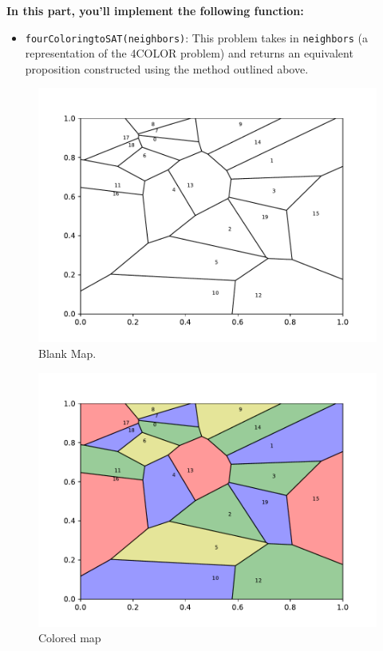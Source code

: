 \documentclass{article}
\begin{document}
    \textbf{In this part, you'll implement the following function:}
    \begin{itemize}
        \item \lstinline{fourColoringtoSAT(neighbors)}: This problem takes in \lstinline{neighbors} (a representation of the 4COLOR problem) and returns an equivalent proposition constructed using the method outlined above.
    \end{itemize}

    \begin{figure}[htbp]
        \centering
        \hspace{1cm}
        \includegraphics[scale = .6]{sp23/hw-supplements/hw3-supp-draft/blank_map.pdf}
        \caption{Blank Map.}
        \label{fig:blank_map}
    \end{figure}


    \begin{figure}[htbp]
        \centering
        \hspace{1cm}
        \includegraphics[scale = .6]{sp23/hw-supplements/hw3-supp-draft/colored_map.pdf}
        \caption{Colored map}
        \label{fig:colored_map}
    \end{figure}
\end{document}

